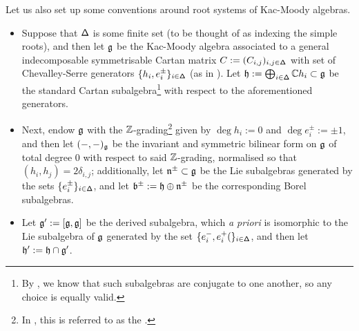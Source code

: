             Let us also set up some conventions around root systems of Kac-Moody algebras.
            \begin{itemize}
                \item Suppose that $\mathsf{\Delta}$ is some finite set (to be thought of as indexing the simple roots), and then let $\mathfrak{g}$ be the Kac-Moody algebra associated to a general indecomposable symmetrisable Cartan matrix $C := (C_{i, j})_{i, j \in \mathsf{\Delta}}$ with set of Chevalley-Serre generators $\{h_i, e_i^{\pm}\}_{i \in \mathsf{\Delta}}$ (as in \cite[Chapter 1]{kac_infinite_dimensional_lie_algebras}). Let $\mathfrak{h} := \bigoplus_{i \in \mathsf{\Delta}} \mathbb{C} h_i \subset \mathfrak{g}$ be the standard Cartan subalgebra\footnote{By \cite{kac_peterson_infinite_flag_varieties_and_conjugacy_of_cartan_subalgebras}, we know that such subalgebras are conjugate to one another, so any choice is equally valid.} with respect to the aforementioned generators.
            
                \item Next, endow $\mathfrak{g}$ with the $\mathbb{Z}$-grading\footnote{In \cite{kac_infinite_dimensional_lie_algebras}, this is referred to as the .} given by $\deg h_i := 0$ and $\deg e_i^{\pm} := \pm 1$, and then let $(-, -)_{\mathfrak{g}}$ be the invariant and symmetric bilinear form on $\mathfrak{g}$ of total degree $0$ with respect to said $\mathbb{Z}$-grading, normalised so that $(h_i, h_j) = 2\delta_{i, j}$; additionally, let $\mathfrak{n}^{\pm} \subset \mathfrak{g}$ be the Lie subalgebras generated by the sets $\{e_i^{\pm}\}_{i \in \mathsf{\Delta}}$, and let $\mathfrak{b}^{\pm} := \mathfrak{h} \oplus \mathfrak{n}^{\pm}$ be the corresponding Borel subalgebras.
                
                \item Let $\mathfrak{g}' := [\mathfrak{g}, \mathfrak{g}]$ be the derived subalgebra, which \textit{a priori} is isomorphic to the Lie subalgebra of $\mathfrak{g}$ generated by the set $\{e_i^-, e_i^+(\}_{i \in \mathsf{\Delta}}$, and then let $\mathfrak{h}' := \mathfrak{h} \cap \mathfrak{g}'$. 
            \end{itemize}

